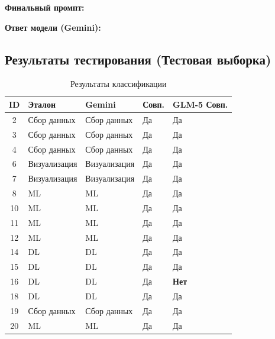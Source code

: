 \documentclass[oneside,a4paper,14pt]{extarticle}
\begin{document}
\noindent
\textbf{Финальный промпт:}


\newpage
\noindent
\textbf{Ответ модели (Gemini):}


\subsection{Результаты тестирования (Тестовая выборка)}
\begin{table}[H]
\centering
\caption{Результаты классификации}
\begin{tabular}{|c|l|l|l|l|}
\hline
\textbf{ID} & \textbf{Эталон} & \textbf{Gemini} & \textbf{Совп.} & \textbf{GLM-5 Совп.} \\ \hline
2 & Сбор данных & Сбор данных & Да & Да \\ \hline
3 & Сбор данных & Сбор данных & Да & Да \\ \hline
4 & Сбор данных & Сбор данных & Да & Да \\ \hline
6 & Визуализация & Визуализация & Да & Да \\ \hline
7 & Визуализация & Визуализация & Да & Да \\ \hline
8 & ML & ML & Да & Да \\ \hline
10 & ML & ML & Да & Да \\ \hline
11 & ML & ML & Да & Да \\ \hline
12 & ML & ML & Да & Да \\ \hline
14 & DL & DL & Да & Да \\ \hline
15 & DL & DL & Да & Да \\ \hline
16 & DL & DL & Да & \textbf{Нет} \\ \hline
18 & DL & DL & Да & Да \\ \hline
19 & Сбор данных & Сбор данных & Да & Да \\ \hline
20 & ML & ML & Да & Да \\ \hline
\end{tabular}
\end{table}

\newpage
\end{document}
